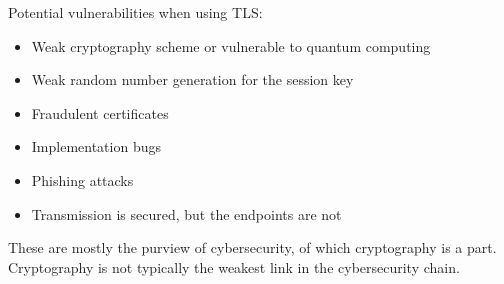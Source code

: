 \documentclass[class=co487,notes]{agony}
\begin{document}
Potential vulnerabilities when using TLS:
\begin{itemize}
  \item Weak cryptography scheme or vulnerable to quantum computing
  \item Weak random number generation for the session key
  \item Fraudulent certificates
  \item Implementation bugs
  \item Phishing attacks
  \item Transmission is secured, but the endpoints are not
\end{itemize}
These are mostly the purview of cybersecurity,
of which cryptography is a part.
Cryptography is not typically the weakest link in the cybersecurity chain.
\end{document}
